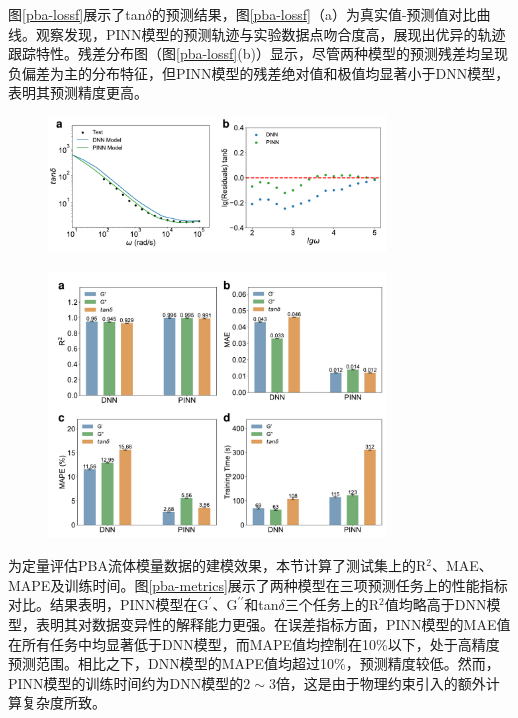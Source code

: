 图\ref{pba-lossf}展示了tan$\delta$的预测结果，图\ref{pba-lossf}（a）为真实值-预测值对比曲线。观察发现，PINN模型的预测轨迹与实验数据点吻合度高，展现出优异的轨迹跟踪特性。残差分布图（图\ref{pba-lossf}(b)）显示，尽管两种模型的预测残差均呈现负偏差为主的分布特征，但PINN模型的残差绝对值和极值均显著小于DNN模型，表明其预测精度更高。
\begin{figure}[htbp]
  \centering
  \includegraphics[width=0.8\textwidth]{Fig/pba-lossf.pdf}
\end{figure}
\begin{figure}[htbp]
  \centering
  \includegraphics[width=0.8\textwidth]{Fig/pba-metrics.pdf}
\end{figure}
为定量评估PBA流体模量数据的建模效果，本节计算了测试集上的R$^2$、MAE、MAPE及训练时间。图\ref{pba-metrics}展示了两种模型在三项预测任务上的性能指标对比。结果表明，PINN模型在$\mathrm{G^{\prime}}$、$\mathrm{G^{\prime\prime}}$和tan$\delta$三个任务上的R$^2$值均略高于DNN模型，表明其对数据变异性的解释能力更强。在误差指标方面，PINN模型的MAE值在所有任务中均显著低于DNN模型，而MAPE值均控制在10\%以下，处于高精度预测范围。相比之下，DNN模型的MAPE值均超过10\%，预测精度较低。然而，PINN模型的训练时间约为DNN模型的$2\sim3$倍，这是由于物理约束引入的额外计算复杂度所致。

